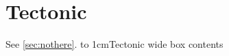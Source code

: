 \documentclass{article}
\begin{document}
\section{Tectonic}\label{sec:t}
See \ref{sec:nothere}.
\undefinedintectonic
\noindent\hbox to 1cm{Tectonic wide box contents}

\end{document}
